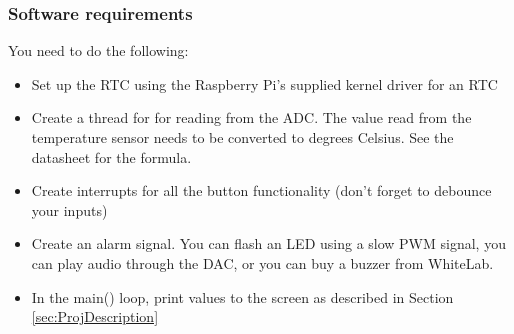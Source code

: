 \subsubsection{Software requirements}
You need to do the following:
\begin{itemize}
    \item Set up the RTC using the Raspberry Pi's supplied kernel driver for an RTC
    \item Create a thread for for reading from the ADC. The value read from the temperature sensor needs to be converted to degrees Celsius. See the datasheet for the formula.
    \item Create interrupts for all the button functionality (don't forget to debounce your inputs)
    \item Create an alarm signal. You can flash an LED using a slow PWM signal, you can play audio through the DAC, or you can buy a buzzer from WhiteLab. 
    \item In the main() loop, print values to the screen as described in Section \ref{sec:ProjDescription}
\end{itemize}


